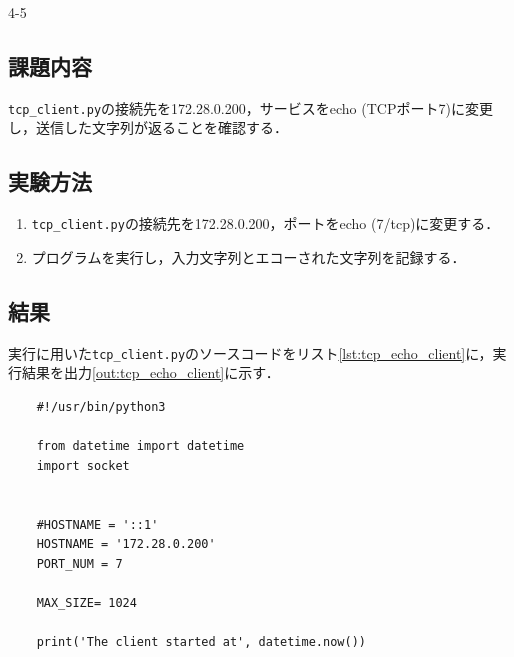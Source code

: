 \begin{maintask}{4-5}
  \subsection*{課題内容}
  \texttt{tcp\_client.py}の接続先を172.28.0.200，サービスをecho (TCPポート7)に変更し，送信した文字列が返ることを確認する．

  \subsection*{実験方法}
  \begin{enumerate}
    \item \texttt{tcp\_client.py}の接続先を172.28.0.200，ポートをecho (7/tcp)に変更する．
    \item プログラムを実行し，入力文字列とエコーされた文字列を記録する．
  \end{enumerate}

  \subsection*{結果}
  実行に用いた\texttt{tcp\_client.py}のソースコードをリスト\ref{lst:tcp_echo_client}に，実行結果を出力\ref{out:tcp_echo_client}に示す．
  \begin{listing}[H]
    \caption{echoサーバ向けtcp\_client.py のソースコード}\label{lst:tcp_echo_client}
    \begin{verbatim}
    #!/usr/bin/python3

    from datetime import datetime
    import socket
                                                                                                                  
                                                                                                                  
    #HOSTNAME = '::1'
    HOSTNAME = '172.28.0.200'
    PORT_NUM = 7
                                                                                                                  
    MAX_SIZE= 1024
                                                                                                                  
    print('The client started at', datetime.now())
                                                                                                                  

\end{verbatim}
\end{listing}
\end{maintask}
